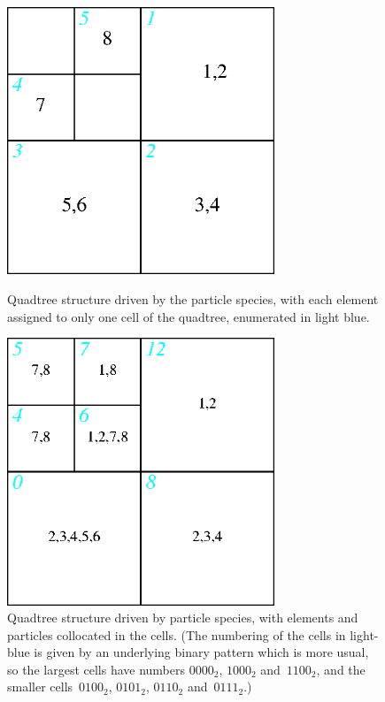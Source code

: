 \begin{figure}
\centerline{\includegraphics[width=8cm]{../pics/octass.png}}
Quadtree structure driven by the particle species, with each element assigned to only one cell
of the quadtree, enumerated in light blue.
\caption{
\label{fig:octass}}
\end{figure}
\begin{figure}
\centerline{\includegraphics[width=8cm]{../pics/octnn.png}}
\caption{
Quadtree structure driven by particle species, with elements and particles collocated in the
cells. (The numbering of the cells in light-blue is given by an underlying binary pattern
which is more usual, so the largest cells have numbers $0000_2$, $1000_2$ and~$1100_2$, 
and the smaller cells~$0100_2$, $0101_2$, $0110_2$ and~$0111_2$.)
\label{fig:octnn}}
\end{figure}

